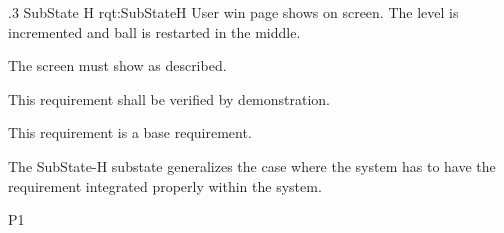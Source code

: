 \ONERQMTV
{\RqtNumberBase.3}
{SubState H}
{rqt:SubStateH}
{User win page shows on screen. The level is incremented and ball is restarted in the middle.}
{
	\item [Phase 1] The screen must show as described.
}
{This requirement shall be verified by demonstration.}
{
	\item [N/A] This requirement is a base requirement.
}
{
	\item The SubState-H substate generalizes the case where the system has to have the requirement integrated properly within the system.
}
{P1}
